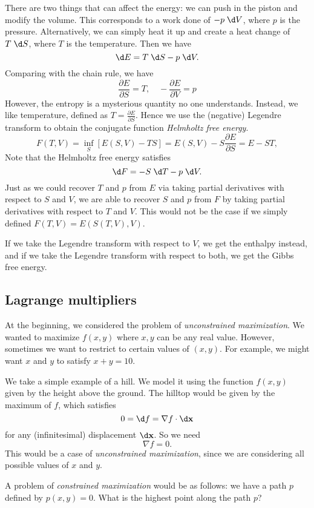 \documentclass[a4paper]{article}
\begin{document}
There are two things that can affect the energy: we can push in the piston and modify the volume. This corresponds to a work done of $-p\;\d V$, where $p$ is the pressure. Alternatively, we can simply heat it up and create a heat change of $T\;\d S$, where $T$ is the temperature. Then we have
\[
  \d E = T\;\d S - p\;\d V.
\]
Comparing with the chain rule, we have
\[
  \frac{\partial E}{\partial S} = T,\quad -\frac{\partial E}{\partial V} = p
\]
However, the entropy is a mysterious quantity no one understands. Instead, we like temperature, defined as $T = \frac{\partial E}{\partial S}$. Hence we use the (negative) Legendre transform to obtain the conjugate function \emph{Helmholtz free energy}.
\[
  F(T, V) = \inf_S [E(S, V) - TS] = E(S, V) - S\frac{\partial E}{\partial S} = E - ST,
\]
Note that the Helmholtz free energy satisfies
\[
  \d F = - S \;\d T - p \;\d V.
\]
Just as we could recover $T$ and $p$ from $E$ via taking partial derivatives with respect to $S$ and $V$, we are able to recover $S$ and $p$ from $F$ by taking partial derivatives with respect to $T$ and $V$. This would not be the case if we simply defined $F(T, V) = E(S(T, V), V)$.

If we take the Legendre transform with respect to $V$, we get the enthalpy instead, and if we take the Legendre transform with respect to both, we get the Gibbs free energy.

\subsection{Lagrange multipliers}
At the beginning, we considered the problem of \emph{unconstrained maximization}. We wanted to maximize $f(x, y)$ where $x, y$ can be any real value. However, sometimes we want to restrict to certain values of $(x, y)$. For example, we might want $x$ and $y$ to satisfy $x + y = 10$.

We take a simple example of a hill. We model it using the function $f(x, y)$ given by the height above the ground. The hilltop would be given by the maximum of $f$, which satisfies
\[
  0 = \d f = \nabla f\cdot \d \mathbf{x}
\]
for any (infinitesimal) displacement $\d \mathbf{x}$. So we need
\[
  \nabla f = 0.
\]
This would be a case of \emph{unconstrained maximization}, since we are considering all possible values of $x$ and $y$.

A problem of \emph{constrained maximization} would be as follows: we have a path $p$ defined by $p(x, y) = 0$. What is the highest point along the path $p$?
\end{document}
